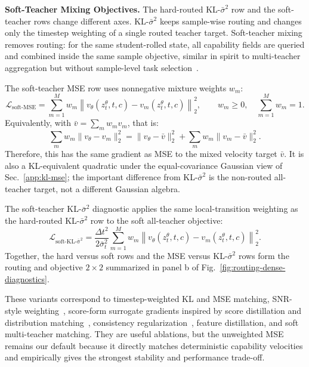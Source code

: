 \documentclass{llmxive}
\begin{document}
\noindent\textbf{Soft-Teacher Mixing Objectives.}
The hard-routed KL-$\bar{\sigma}^2$ row and the soft-teacher rows change different axes. KL-$\bar{\sigma}^2$ keeps sample-wise routing and changes only the timestep weighting of a single routed teacher target. Soft-teacher mixing removes routing: for the same student-rolled state, all capability fields are queried and combined inside the same sample objective, similar in spirit to multi-teacher aggregation but without sample-level task selection~\cite{shen2019customizing}.

The soft-teacher MSE row uses nonnegative mixture weights $w_m$:
\begin{equation}
  \mathcal{L}_{\mathrm{soft\text{-}MSE}}
  =\sum_{m=1}^{M}w_m\left\|v_\theta(z_t^\theta,t,c)-v_m(z_t^\theta,t,c)\right\|_2^2,
  \qquad w_m\ge0,\quad \sum_{m=1}^{M}w_m=1.
  \label{eq:app-loss-soft-teacher}
\end{equation}
Equivalently, with $\bar{v}=\sum_m w_m v_m$, that is:
\begin{equation}
  \sum_m w_m\|v_\theta-v_m\|_2^2
  =\|v_\theta-\bar{v}\|_2^2+
    \sum_m w_m\|v_m-\bar{v}\|_2^2.
  \label{eq:app-soft-mse-equivalence}
\end{equation}
Therefore, this has the same gradient as MSE to the mixed velocity target $\bar{v}$. It is also a KL-equivalent quadratic under the equal-covariance Gaussian view of Sec.~\ref{app:kl-mse}; the important difference from KL-$\bar{\sigma}^2$ is the non-routed all-teacher target, not a different Gaussian algebra.

The soft-teacher KL-$\bar{\sigma}^2$ diagnostic applies the same local-transition weighting as the hard-routed KL-$\bar{\sigma}^2$ row to the soft all-teacher objective:
\begin{equation}
  \mathcal{L}_{\mathrm{soft\text{-}KL\text{-}\bar{\sigma}^2}}
  =\frac{\Delta t^2}{2\bar{\sigma}_t^2}
    \sum_{m=1}^{M}w_m\left\|v_\theta(z_t^\theta,t,c)-v_m(z_t^\theta,t,c)\right\|_2^2.
  \label{eq:app-loss-soft-kl-sigma}
\end{equation}
Together, the hard versus soft rows and the MSE versus KL-$\bar{\sigma}^2$ rows form the routing and objective $2\times2$ summarized in panel b of Fig.~\ref{fig:routing-dense-diagnostics}.

These variants correspond to timestep-weighted KL and MSE matching, SNR-style weighting~\cite{hang2023efficient}, score-form surrogate gradients inspired by score distillation and distribution matching~\cite{poole2022dreamfusion,sauer2024adversarial,sauer2024fast,yin2024one}, consistency regularization~\cite{song2023consistency,kim2024consistency}, feature distillation, and soft multi-teacher matching. They are useful ablations, but the unweighted MSE remains our default because it directly matches deterministic capability velocities and empirically gives the strongest stability and performance trade-off.
\end{document}

